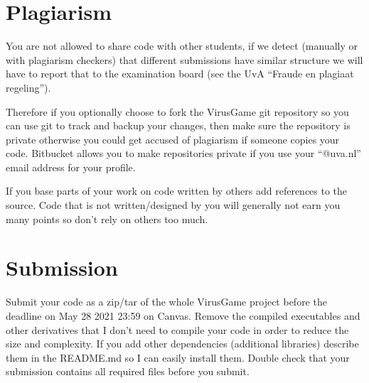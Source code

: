 \documentclass[12pt]{article}
\begin{document}
\section{Plagiarism}
You are not allowed to share code with other students, if we detect
(manually or with plagiarism checkers) that different submissions have
similar structure we will have to report that to the examination
board (see the UvA ``Fraude en plagiaat regeling'').

Therefore if you optionally choose to fork the VirusGame git
repository so you can use git to track and backup your changes, then
make sure the repository is private otherwise you could get accused of
plagiarism if someone copies your code. Bitbucket allows you to make
repositories private if you use your ``@uva.nl'' email address for
your profile.

If you base parts of your work on code written by others add
references to the source. Code that is not written/designed by you
will generally not earn you many points so don't rely on others too
much.

\section{Submission}
Submit your code as a zip/tar of the whole VirusGame project before
the deadline on May 28 2021 23:59 on Canvas. Remove the compiled
executables and other derivatives that I don't need to compile your
code in order to reduce the size and complexity. If you add other
dependencies (additional libraries) describe them in the README.md so
I can easily install them. Double check that your submission contains
all required files before you submit.
\end{document}
